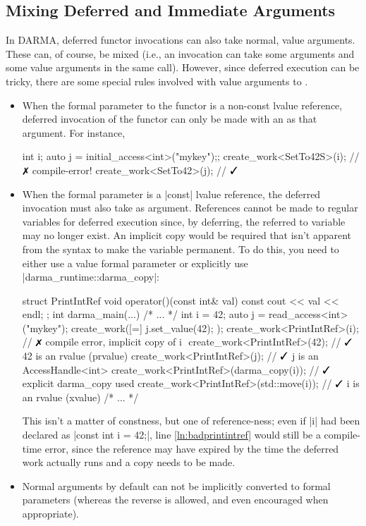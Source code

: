 \subsection{Mixing Deferred and Immediate Arguments}
In \gls{DARMA}, deferred functor invocations can also take normal, value arguments. 
These can, of course, be mixed (i.e., an invocation can take some
 arguments and some value arguments in the same call).  However,
since \gls{deferred execution} can be tricky, there are some special rules involved
with value arguments to .
\begin{itemize}
  \item When the formal parameter to the functor is a non-const lvalue
  reference, deferred invocation of the functor can only be made
  with an  as that argument.  For instance,
\begin{CppCodeNumb}
int i;
auto j = initial_access<int>("mykey");;
create_work<SetTo42S>(i); // $\no$ compile-error!
create_work<SetTo42>(j); // $\yes$
\end{CppCodeNumb}
  \item When the formal parameter is a |const| lvalue reference, the deferred
    invocation must also take  as argument.  
    References cannot be made to regular \CC{} variables for \gls{deferred
    execution} since, by deferring,
  the referred to variable may no longer exist.
  An implicit copy would be required that isn't apparent from the syntax to make the variable permanent.  
  To do this, you need to either use a value formal parameter or explicitly use
|darma_runtime::darma_copy|:
\begin{CppCodeNumb}
struct PrintIntRef {
  void operator()(const int& val) const { cout << val << endl; }
};
int darma_main(...) {
  /* ... */
  int i = 42;
  auto j = read_access<int>("mykey");
  create_work([=]{ j.set_value(42); });
  create_work<PrintIntRef>(i); // $\no$ compile error, implicit copy of i $\label{ln:badprintintref}$
  create_work<PrintIntRef>(42); // $\yes$ 42 is an rvalue (prvalue)
  create_work<PrintIntRef>(j); // $\yes$ j is an AccessHandle<int>
  create_work<PrintIntRef>(darma_copy(i)); // $\yes$ explicit darma_copy used
  create_work<PrintIntRef>(std::move(i)); // $\yes$ i is an rvalue (xvalue)
  /* ... */
}
\end{CppCodeNumb}
  This isn't a matter of constness, but one of reference-ness; even if |i| had
  been declared as |const int i = 42;|, line \ref{ln:badprintintref} would still
  be a compile-time error, since the reference may have expired by the time the
  \gls{deferred work} actually runs and a copy needs to be made.
\item Normal arguments by default can not be implicitly converted to  formal
  parameters (whereas the reverse is allowed, and even encouraged when appropriate).
\end{itemize}


